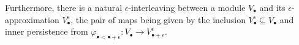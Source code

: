 \documentclass[11pt]{article}
\newcommand{\bu}{_{\bullet}}
\newcommand{\bue}{_{\bullet+\epsilon}}
\newcommand{\FF}{\mathbb{F}}
\newcommand{\QQ}{\mathbb{Q}}
\newcommand{\RR}{\mathbb{R}}
\newcommand{\ZZ}{\mathbb{Z}}
\newcommand{\I}{\mathcal{I}}
\newcounter{height}
\begin{document}
Furthermore, there is a natural $\epsilon$-interleaving between a module $V\bu$ and its $\epsilon$-approximation $V^{\epsilon}\bu$, the pair of maps being given by the inclusion $V^{\epsilon}\bu\subseteq V\bu$ and inner persistence from $\varphi_{\bullet<\bullet+\epsilon}: V\bu \to V^{\epsilon}\bue$.








\end{document}

